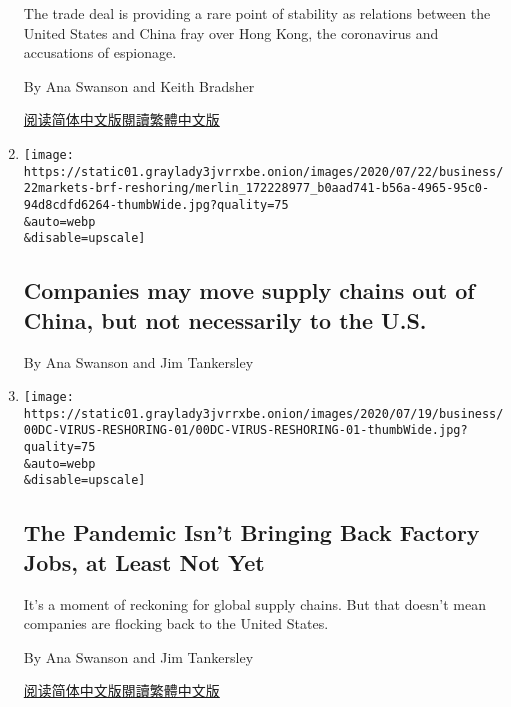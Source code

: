 \begin{enumerate}
  The trade deal is providing a rare point of stability as relations
  between the United States and China fray over Hong Kong, the
  coronavirus and accusations of espionage.

  By Ana Swanson and Keith Bradsher

  \href{https://cn.nytimes3xbfgragh.onion/business/20200727/us-china-trade-diplomacy/}{阅读简体中文版}\href{https://cn.nytimes3xbfgragh.onion/business/20200727/us-china-trade-diplomacy/zh-hant/}{閱讀繁體中文版}
\item
  \href{/2020/07/22/business/companies-may-move-supply-chains-out-of-china-but-not-necessarily-to-the-us.html}{}

  \texttt{[image: https://static01.graylady3jvrrxbe.onion/images/2020/07/22/business/22markets-brf-reshoring/merlin\_172228977\_b0aad741-b56a-4965-95c0-94d8cdfd6264-thumbWide.jpg?quality=75\\\&auto=webp\\\&disable=upscale]}

  \hypertarget{companies-may-move-supply-chains-out-of-china-but-not-necessarily-to-the-us}{%
  \subsection{Companies may move supply chains out of China, but not
  necessarily to the
  U.S.}\label{companies-may-move-supply-chains-out-of-china-but-not-necessarily-to-the-us}}

  By Ana Swanson and Jim Tankersley
\item
  \href{/2020/07/22/business/economy/coronavirus-globalization-jobs-supply-chain-china.html}{}

  \texttt{[image: https://static01.graylady3jvrrxbe.onion/images/2020/07/19/business/00DC-VIRUS-RESHORING-01/00DC-VIRUS-RESHORING-01-thumbWide.jpg?quality=75\\\&auto=webp\\\&disable=upscale]}

  \hypertarget{the-pandemic-isnt-bringing-back-factory-jobs-at-least-not-yet}{%
  \subsection{The Pandemic Isn't Bringing Back Factory Jobs, at Least
  Not
  Yet}\label{the-pandemic-isnt-bringing-back-factory-jobs-at-least-not-yet}}

  It's a moment of reckoning for global supply chains. But that doesn't
  mean companies are flocking back to the United States.

  By Ana Swanson and Jim Tankersley

  \href{https://cn.nytimes3xbfgragh.onion/business/20200723/coronavirus-globalization-jobs-supply-chain-china/}{阅读简体中文版}\href{https://cn.nytimes3xbfgragh.onion/business/20200723/coronavirus-globalization-jobs-supply-chain-china/zh-hant/}{閱讀繁體中文版}
\end{enumerate}

